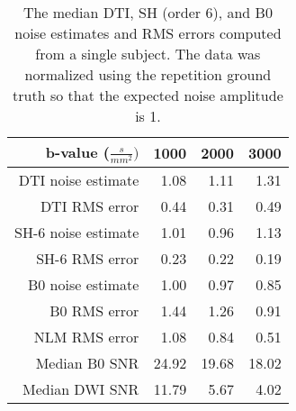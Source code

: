 \begin{table}
\caption{
\label{tab:humanEstimate}
The median DTI, SH (order 6), and B0 noise estimates and RMS errors computed from a single subject. The data was normalized using the repetition ground truth so that the expected noise amplitude is 1.}
\begin{tabular}[c]{@{}rrrr@{}}
\toprule
b-value (\(\frac{s}{mm^{2}})\) & 1000 & 2000 & 3000\tabularnewline
\midrule
DTI noise estimate & 1.08 & 1.11 & 1.31\tabularnewline
DTI RMS error & 0.44 & 0.31 & 0.49\tabularnewline
SH-6 noise estimate & 1.01 & 0.96 & 1.13\tabularnewline
SH-6 RMS error & 0.23 & 0.22 & 0.19\tabularnewline
B0 noise estimate & 1.00 & 0.97 & 0.85\tabularnewline
B0 RMS error & 1.44 & 1.26 & 0.91\tabularnewline
NLM RMS error & 1.08 & 0.84 & 0.51\tabularnewline
Median B0 SNR & 24.92 & 19.68 & 18.02\tabularnewline
Median DWI SNR & 11.79 & 5.67 & 4.02\tabularnewline
\bottomrule
\end{tabular}
\end{table}